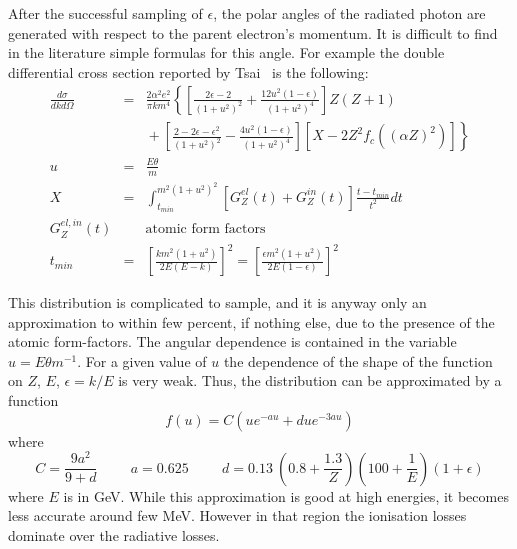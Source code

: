 After the successful sampling of $\epsilon$,  the
polar angles of the radiated photon are generated with respect to the parent
electron's momentum. It is difficult to find in the literature
simple formulas for this angle. For example the double differential
cross section reported by Tsai~\cite{ebrem.tsai1,ebrem.tsai2} is the
following:
\begin{eqnarray*}
\frac{d \sigma}{dkd \Omega}
& = & \frac{2 \alpha^{2}e^{2}}{\pi k m^{4}}
  \left\{ \left[ \frac{2\epsilon-2}{(1+u^2)^2}+
\frac{12u^2(1-\epsilon)}{(1+u^2)^4}\right]
      Z(Z+1)  \right. \\
&   & \mbox{} + \left. \left[ \frac{2-2\epsilon-\epsilon^{2}}{(1+u^2)^2}-
      \frac{4u^2(1-\epsilon)}{(1+u^2)^4}
      \right]
      \left[ X-2Z^{2}f_{c}((\alpha Z)^{2})\right]
      \right\} \\
u & = & \frac{E \theta}{m} \\
X & = & \int_{t_{min}}^{m^{2}(1+u^{2})^{2}}
{\left [ G_{Z}^{el}(t) + G_{Z}^{in}(t) \right ] \frac{t-t_{min}}
{t^{2}} dt} \\
G_{Z}^{el, in}(t) & & \mbox{atomic form factors} \\
t_{min} & = & \left [ \frac{k m^{2} (1+u^{2})}{2 E (E-k)} \right ] ^{2}
 = \left [ \frac{\epsilon m^{2} (1+u^{2})}{2 E (1-\epsilon)} \right ] ^{2}
\end{eqnarray*}

This distribution is complicated to sample, and it is anyway only an
approximation to within few percent, if nothing else, due to
the presence of the atomic form-factors.
The angular dependence is contained in the
variable $u = E \theta m^{-1}$. For a given value
of $u$ the dependence of the shape of the function on $Z$, $E$,
$\epsilon = k/E$ is very weak.
Thus, the distribution can be approximated by a function
\begin{equation}
f(u) = C \left( u e^{-au} + d u e^{-3au} \right)
\end{equation}
where
\[
C = \frac{9a^{2}}{9 + d} \hspace{1cm} a = 0.625 \hspace{1cm}
d = 0.13 \: \left ( 0.8+\frac{1.3}{Z} \right ) \left (100+\frac{1}{E} \right )
(1+\epsilon)
\]
where $E$ is in GeV. While this approximation is good at high energies,
it becomes less accurate around few MeV. However in that region the
ionisation losses dominate over the radiative losses.


